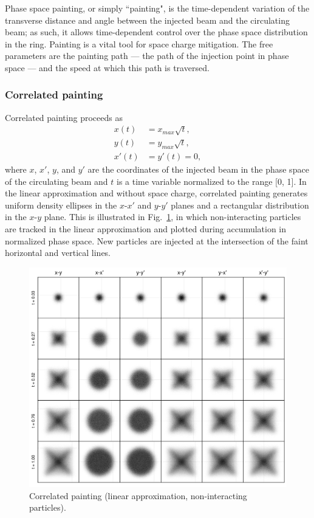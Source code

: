 Phase space painting, or simply ``painting", is the time-dependent variation of the transverse distance and angle between the injected beam and the circulating beam; as such, it allows time-dependent control over the phase space distribution in the ring. Painting is a vital tool for space charge mitigation. The free parameters are the painting path — the path of the injection point in phase space — and the speed at which this path is traversed. 


\subsubsection{Correlated painting}

Correlated painting proceeds as
%
\begin{equation}
\begin{aligned}
    {x}(t) &= {x}_{max}\sqrt{t}, \\
    {y}(t) &= {y}_{max}\sqrt{t}, \\
    x'(t) &= y'(t) = 0,
\end{aligned}
\end{equation}
%
where $x$, $x'$, $y$, and $y'$ are the coordinates of the injected beam in the phase space of the circulating beam and $t$ is a time variable normalized to the range [0, 1]. In the linear approximation and without space charge, correlated painting generates uniform density ellipses in the $x$-$x'$ and $y$-$y'$ planes and a rectangular distribution in the $x$-$y$ plane. This is illustrated in Fig.~\ref{fig:correlated_painting}, in which non-interacting particles are tracked in the linear approximation and plotted during accumulation in normalized phase space. New particles are injected at the intersection of the faint horizontal and vertical lines.
%
\begin{figure}[!p]
    \centering
    \includegraphics[width=\textwidth]{Images/chapter1/snapshots_corr.png}
    \caption{Correlated painting (linear approximation, non-interacting particles).}
    \label{fig:correlated_painting}
\end{figure}
